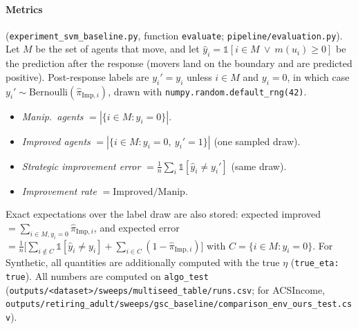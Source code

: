 \paragraph{Metrics} (\texttt{experiment\_svm\_baseline.py}, function
\texttt{evaluate}; \texttt{pipeline/evaluation.py}). Let $M$ be the set of
agents that move, and let $\hat y_i=\mathbb{1}[i\in M\ \vee\ m(u_i)\ge 0]$ be
the prediction after the response (movers land on the boundary and are
predicted positive). Post-response labels are $y_i'=y_i$ unless $i\in M$ and
$y_i=0$, in which case $y_i'\sim\mathrm{Bernoulli}(\widehat{\pi}_{\mathrm{Imp},i})$,
drawn with \texttt{numpy.random.default\_rng(42)}.
\begin{itemize}
  \item \emph{Manip.\ agents} $=|\{i\in M: y_i=0\}|$.
  \item \emph{Improved agents} $=|\{i\in M: y_i=0,\ y_i'=1\}|$ (one sampled
        draw).
  \item \emph{Strategic improvement error} $=\frac{1}{n}\sum_i\mathbb{1}[\hat y_i\neq y_i']$
        (same draw).
  \item \emph{Improvement rate} $=\text{Improved}/\text{Manip.}$
\end{itemize}
Exact expectations over the label draw are also stored: expected improved
$=\sum_{i\in M,y_i=0}\widehat{\pi}_{\mathrm{Imp},i}$, and expected error
$=\frac1n\big[\sum_{i\notin C}\mathbb{1}[\hat y_i\neq y_i]+\sum_{i\in C}(1-\widehat{\pi}_{\mathrm{Imp},i})\big]$
with $C=\{i\in M: y_i=0\}$. For Synthetic, all quantities are additionally
computed with the true $\eta$ (\texttt{true\_eta: true}). All numbers are
computed on \texttt{algo\_test} (\texttt{outputs/<dataset>/sweeps/multiseed\_table/runs.csv};
for ACSIncome, \texttt{outputs/retiring\_adult/sweeps/gsc\_baseline/comparison\_env\_ours\_test.csv}).

